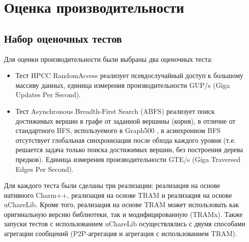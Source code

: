 \documentclass[11pt, oneside, a4paper]{article}
\begin{document}

\section{Оценка производительности}

\subsection{Набор оценочных тестов}


Для оценки производительности были выбраны два оценочных теста: 
\begin{itemize}
\item Тест  HPCC RandomAccess\cite{Luszczek:2006}  реализует псевдослучайный доступ к большому массиву данных, единица измерения 
	производительности GUP/s (Giga Updates Per Second). 
\item Тест Asynchronous Breadth-First Search (ABFS) реализует поиск достижимых вершин в графе от заданной вершины (корня), 
	в отличие от стандартного BFS, используемого в Graph500 \cite{Graph500}, в асинхронном BFS отсутствует глобальная синхронизация после 
	обхода каждого уровня (т.е. решается задача только поиска достижимых вершин, без построения дерева предков). Единица измерения 
	производительности GTE/s (Giga Traversed Edges Per Second). 
\end{itemize}

Для каждого теста были сделаны три реализации: реализация на основе нативного Charm++, реализация на основе TRAM и
реализация на основе uChareLib. Кроме того, реализация на основе TRAM может использовать как оригинальную версию 
библиотеки, так и модифицированную (TRAMx). Также запуски тестов с использованием uChareLib осуществлялись с двумя
способами агрегации сообщений (P2P-агрегация и агрегация с использованием TRAM).
\end{document}
